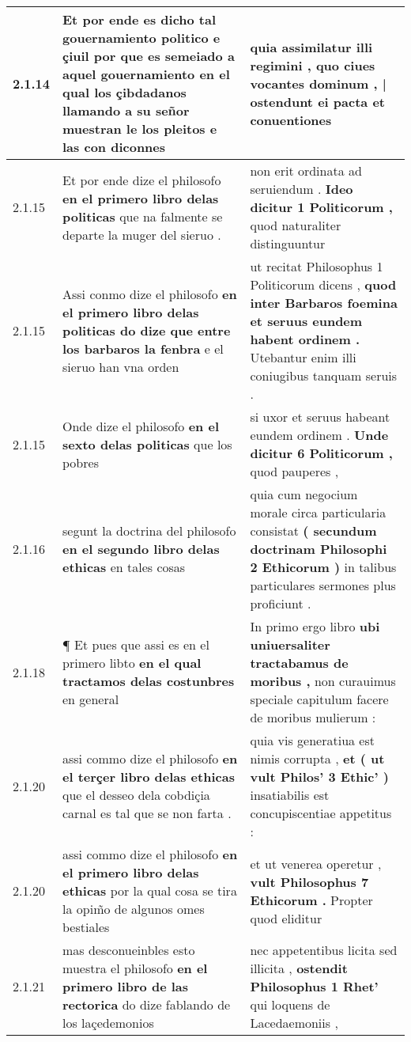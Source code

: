 \begin{tabular}{|p{1cm}|p{6.5cm}|p{6.5cm}|}
2.1.14 & Et por ende es dicho tal gouernamiento politico e çiuil por que es semeiado a aquel gouernamiento \textbf{ en el qual los çibdadanos llamando a su señor muestran le los pleitos } e las con diconnes & quia assimilatur illi regimini , \textbf{ quo ciues vocantes dominum , | ostendunt ei pacta } et conuentiones \\\hline
2.1.15 & Et por ende dize el philosofo \textbf{ en el primero libro delas politicas } que na falmente se departe la muger del sieruo . & non erit ordinata ad seruiendum . \textbf{ Ideo dicitur 1 Politicorum , } quod naturaliter distinguuntur \\\hline
2.1.15 & Assi conmo dize el philosofo \textbf{ en el primero libro delas politicas do dize que entre los barbaros la fenbra } e el sieruo han vna orden & ut recitat Philosophus 1 Politicorum dicens , \textbf{ quod inter Barbaros foemina et seruus eundem habent ordinem . } Utebantur enim illi coniugibus tanquam seruis . \\\hline
2.1.15 & Onde dize el philosofo \textbf{ en el sexto delas politicas } que los pobres & si uxor et seruus habeant eundem ordinem . \textbf{ Unde dicitur 6 Politicorum , } quod pauperes , \\\hline
2.1.16 & segunt la doctrina del philosofo \textbf{ en el segundo libro delas ethicas } en tales cosas & quia cum negocium morale circa particularia consistat \textbf{ ( secundum doctrinam Philosophi 2 Ethicorum ) } in talibus particulares sermones plus proficiunt . \\\hline
2.1.18 & ¶ Et pues que assi es en el primero libto \textbf{ en el qual tractamos delas costunbres } en general & In primo ergo libro \textbf{ ubi uniuersaliter tractabamus de moribus , } non curauimus speciale capitulum facere de moribus mulierum : \\\hline
2.1.20 & assi commo dize el philosofo \textbf{ en el terçer libro delas ethicas } que el desseo dela cobdiçia carnal es tal que se non farta . & quia vis generatiua est nimis corrupta , \textbf{ et ( ut vult Philos’ 3 Ethic’ ) } insatiabilis est concupiscentiae appetitus : \\\hline
2.1.20 & assi commo dize el philosofo \textbf{ en el primero libro delas ethicas } por la qual cosa se tira la opim̃o de algunos omes bestiales & et ut venerea operetur , \textbf{ vult Philosophus 7 Ethicorum . } Propter quod eliditur \\\hline
2.1.21 & mas desconueinbles esto muestra el philosofo \textbf{ en el primero libro de las rectorica } do dize fablando de los laçedemonios & nec appetentibus licita sed illicita , \textbf{ ostendit Philosophus 1 Rhet’ } qui loquens de Lacedaemoniis , \\\hline

\end{tabular}
